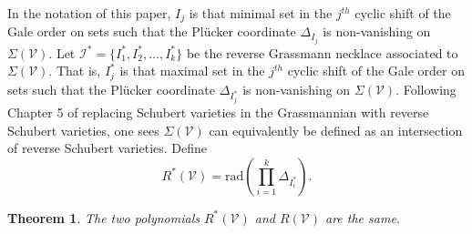 \documentclass[11pt]{article}
\newcommand{\cV}{\mathcal{V}}
\newtheorem{thm}{Theorem}[section]
\theoremstyle{remark}
\theoremstyle{definition}
\begin{document}
In the notation of this paper, $I_j$ is that minimal set in the $j^{th}$ cyclic shift of the Gale order on sets such that the Pl\"ucker coordinate $\Delta_{I_j}$ is non-vanishing on $\Sigma(\cV)$. Let $\mathcal{I}^{\ast} = \{I^{\ast}_1, I^{\ast}_2, \dots, I^{\ast}_{k}\}$ be the reverse Grassmann necklace associated to $\Sigma(\cV)$. That is, $I^{\ast}_j$ is that maximal set in the $j^{th}$ cyclic shift of the Gale order on sets such that the Pl\"ucker coordinate $\Delta_{I^*_j}$ is non-vanishing on $\Sigma(\cV)$. Following Chapter 5 of \cite{knutsonlamspeyerjuggling} replacing Schubert varieties in the Grassmannian with reverse Schubert varieties, one sees $\Sigma(\cV)$ can equivalently be defined as an intersection of reverse Schubert varieties. Define
%
\begin{displaymath}
R^{\ast}(\cV) = \mathrm{rad}\left(\prod_{i = 1}^{k} \Delta_{I^{\ast}_i}\right).
\end{displaymath}


\begin{thm}
The two polynomials $R^{\ast}(\cV)$ and $R(\cV)$ are the same.
\end{thm}
\end{document}
